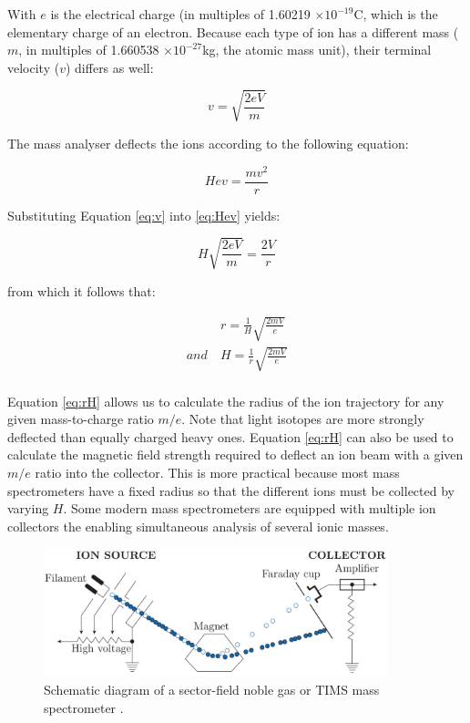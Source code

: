 \documentclass{book}
\newif\ifpdf
\begin{document}
With $e$ is the electrical charge (in multiples of 1.60219 $\times
10^{-19}$C, which is the elementary charge of an electron.  Because
each type of ion has a different mass ($m$, in multiples of 1.660538
$\times 10^{-27}$kg, the atomic mass unit), their terminal velocity
($v$) differs as well:

\begin{equation}
v = \sqrt{\frac{2 e V}{m}}
\label{eq:v}
\end{equation}

The mass analyser deflects the ions according to the following equation:

\begin{equation}
H e v = \frac{m v^2}{r}
\label{eq:Hev}
\end{equation}

Substituting Equation \ref{eq:v} into \ref{eq:Hev} yields:

\begin{equation}
H \sqrt{\frac{2 e V}{m}} = \frac{2 V}{r}
\label{eq:H2eVm}
\end{equation}

from which it follows that:

\begin{equation}
\begin{array}{rl}
~ & r = \frac{1}{H}\sqrt{\frac{2 m V}{e}} \\
and~ & H = \frac{1}{r}\sqrt{\frac{2 m V}{e}}\\
\end{array}
\label{eq:rH}
\end{equation}

Equation \ref{eq:rH} allows us to calculate the radius of the ion
trajectory for any given mass-to-charge ratio $m/e$. Note that light
isotopes are more strongly deflected than equally charged heavy ones.
Equation \ref{eq:rH} can also be used to calculate the magnetic field
strength required to deflect an ion beam with a given $m/e$ ratio into
the collector.  This is more practical because most mass spectrometers
have a fixed radius so that the different ions must be collected by
varying $H$. Some modern mass spectrometers are equipped with multiple
ion collectors the enabling simultaneous analysis of several ionic
masses.

\begin{figure}[!ht]
  \centering
  \ifpdf
  \def\svgwidth{\textwidth}
  
  \else
  \includegraphics[width=10cm]{mass-spec.png}
  \fi
  \caption{Schematic diagram of a sector-field noble gas or TIMS mass
    spectrometer \citep[modified from][]{allegre2008}.}
  \label{fig:mass-spec}
\end{figure}
\end{document}
